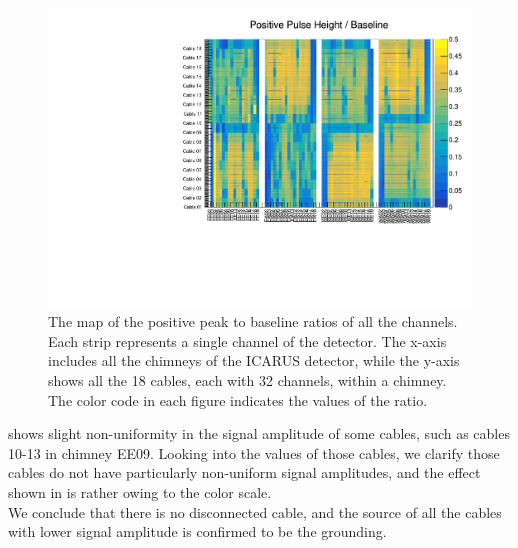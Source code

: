 \begin{figure}
\centering
\includegraphics[width=\textwidth]{fig/PosPeakToBaseline.pdf}
\caption{The map of the positive peak to baseline ratios of all the channels.
Each strip represents a single channel of the detector.
The x-axis includes all the chimneys of the ICARUS detector, while
the y-axis shows all the 18 cables, each with 32 channels, within a chimney.
The color code in each figure indicates the values of the ratio.}
\label{fig:pospeaktobaseline}
\end{figure}

 shows slight non-uniformity
in the signal amplitude of some cables, 
such as cables 10-13 in chimney EE09.
Looking into the values of those cables, we clarify those cables do not
have particularly non-uniform signal amplitudes, and the effect shown
in  is rather owing to the color scale.\\

We conclude that there is no disconnected cable, and the source of all 
the cables with lower signal amplitude is confirmed to be the grounding.


